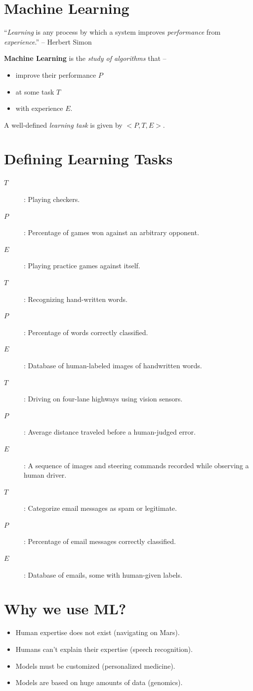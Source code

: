 \documentclass[
	number={1},
	title={Machine Learning Fundamentals}
]{cs584notes}
\begin{document}
\newcommand{\learningtask}[3]{%
	\begin{description}
	\item[$T$]: #1
	\item[$P$]: #2
	\item[$E$]: #3
	\end{description}
	\vspace*{0.25em}
}

\section{Machine Learning}\label{sec:machine-learning}
\begin{displayquote}
	``\emph{Learning} is any process by which a system improves \emph{performance} from \emph{experience}.'' -- Herbert Simon
\end{displayquote}

\textbf{Machine Learning} is the \emph{study of algorithms} that --
\begin{itemize}
	\item improve their performance \emph{$P$}
	\item at some task \emph{$T$}
	\item with experience \emph{$E$}.
\end{itemize}
A well-defined \emph{learning task} is given by \emph{$<P,T,E>$}.

\section{Defining Learning Tasks}\label{sec:defining-learning-tasks}
\learningtask{Playing checkers.}{Percentage of games won against an arbitrary opponent.}{Playing practice games against itself.}

\learningtask{Recognizing hand-written words.}{Percentage of words correctly classified.}{Database of human-labeled images of handwritten words.}

\learningtask{Driving on four-lane highways using vision sensors.}{Average distance traveled before a human-judged error.}{A sequence of images and steering commands recorded while observing a human driver.}

\learningtask{Categorize email messages as spam or legitimate.}{Percentage of email messages correctly classified.}{Database of emails, some with human-given labels.}

\section{Why we use ML?}\label{sec:why-we-use-ml?}
\begin{itemize}
	\item Human expertise does not exist (navigating on Mars).
	\item Humans can't explain their expertise (speech recognition).
	\item Models must be customized (personalized medicine).
	\item Models are based on huge amounts of data (genomics).
\end{itemize}
\end{document}
